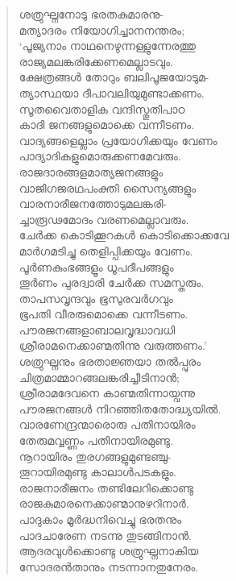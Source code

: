 \begin{verse}
ശത്രുഘ്നനോടു ഭരതകുമാരനു-\\
മത്യാദരം നിയോഗിച്ചാനനന്തരം;\\
‘പൂജ്യനാം നാഥനെഴുന്നള്ളുന്നേരത്തു\\
രാജ്യമലങ്കരിക്കേണമെല്ലാടവും.\\
ക്ഷേത്രങ്ങള്‍ തോറും ബലിപൂജയോടുമ-\\
ത്യാസ്ഥയാ ദീപാവലിയുമുണ്ടാക്കണം.\\
സൂതവൈതാളിക വന്ദിസ്തുതിപാഠ\\
കാദി ജനങ്ങളുമൊക്കെ വന്നീടണം.\\
വാദ്യങ്ങളെല്ലാം പ്രയോഗിക്കയും വേണം\\
പാദ്യാദികളുമൊരുക്കണമേവരും.\\
രാജദാരങ്ങളമാത്യജനങ്ങളും\\
വാജിഗജരഥപംക്തി സൈന്യങ്ങളും\\
വാരനാരീജനത്തോടുമലങ്കരി-\\
ച്ചാരൂഢമോദം വരണമെല്ലാവരും.\\
ചേര്‍ക്ക കൊടിക്കൂറകള്‍ കൊടിക്കൊക്കവേ\\
മാര്‍ഗമടിച്ചു തെളിപ്പിക്കയും വേണം.\\
പൂര്‍ണകുംഭങ്ങളൂം ധൂപദീപങ്ങളും\\
തൂര്‍ണം പുരദ്വാരി ചേര്‍ക്ക സമസ്തരും.\\
താപസവൃന്ദവും ഭൂസുരവര്‍ഗവും\\
ഭൂപതി വീരരുമൊക്കെ വന്നീടണം.\\
പൗരജനങ്ങളാബാലവൃദ്ധാവധി\\
ശ്രീരാമനെക്കാണ്മതിന്നു വരുത്തണം.’\\
ശത്രുഘ്നനും ഭരതാജ്ഞയാ തല്‍പ്പുരം\\
ചിത്രമാമ്മാറങ്ങലങ്കരിച്ചീടിനാന്‍;\\
ശ്രീരാമദേവനെ കാണ്മതിന്നായ്വന്നു\\
പൗരജനങ്ങള്‍ നിറഞ്ഞിതതോദ്ധ്യയില്‍.\\
വാരണേന്ദ്രന്മാരൊരു പതിനായിരം\\
തേരുമവ്വണ്ണം പതിനായിരമുണ്ടു.\\
നൂറായിരം തുരഗങ്ങളുമുണ്ടഞ്ചു-\\
തൂറായിരമുണ്ടു കാലാള്‍പടകളും.\\
രാജനാരീജനം തണ്ടിലേറിക്കൊണ്ടു\\
രാജകുമാരനെക്കാണ്മാനുഴറിനാര്‍.\\
പാദുകാം മൂര്‍ദ്ധനിവെച്ചു ഭരതനും\\
പാദചാരേണ നടന്നു തുടങ്ങിനാന്‍.\\
ആദരവുള്‍ക്കൊണ്ടു ശത്രുഘ്നനാകിയ\\
സോദരന്‍താനും നടന്നാനതുനേരം.\\

\end{verse}
